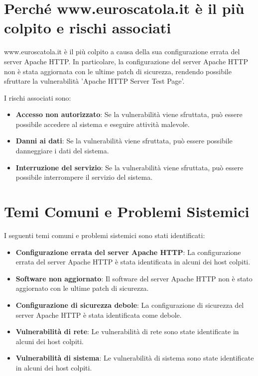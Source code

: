 \section{Perché www.euroscatola.it è il più colpito e rischi associati}

www.euroscatola.it è il più colpito a causa della sua configurazione errata del server Apache HTTP. In particolare, la configurazione del server Apache HTTP non è stata aggiornata con le ultime patch di sicurezza, rendendo possibile sfruttare la vulnerabilità 'Apache HTTP Server Test Page'.

I rischi associati sono:
\begin{itemize}
\item \textbf{Accesso non autorizzato}: Se la vulnerabilità viene sfruttata, può essere possibile accedere al sistema e eseguire attività malevole.
\item \textbf{Danni ai dati}: Se la vulnerabilità viene sfruttata, può essere possibile danneggiare i dati del sistema.
\item \textbf{Interruzione del servizio}: Se la vulnerabilità viene sfruttata, può essere possibile interrompere il servizio del sistema.
\end{itemize}
\section{Temi Comuni e Problemi Sistemici}

I seguenti temi comuni e problemi sistemici sono stati identificati:
\begin{itemize}
\item \textbf{Configurazione errata del server Apache HTTP}: La configurazione errata del server Apache HTTP è stata identificata in alcuni dei host colpiti.
\item \textbf{Software non aggiornato}: Il software del server Apache HTTP non è stato aggiornato con le ultime patch di sicurezza.
\item \textbf{Configurazione di sicurezza debole}: La configurazione di sicurezza del server Apache HTTP è stata identificata come debole.
\item \textbf{Vulnerabilità di rete}: Le vulnerabilità di rete sono state identificate in alcuni dei host colpiti.
\item \textbf{Vulnerabilità di sistema}: Le vulnerabilità di sistema sono state identificate in alcuni dei host colpiti.
\end{itemize}


